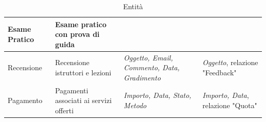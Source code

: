 \documentclass[10pt,twoside]{article}
\begin{document}
{\begin{table}[H]
\begin{tabularx}{\textwidth}{|>{\centering\arraybackslash}p{2.6cm}|>{\centering\arraybackslash}X|>{\centering\arraybackslash}p{4.85cm}|>{\centering\arraybackslash}X|}
            \rowcolor{white!40}
            Esame Pratico & Esame pratico con prova di guida & & \\
            \hline
            \rowcolor{white!40}
            Recensione & Recensione istruttori e lezioni & \textit{Oggetto, Email, Commento, Data, Gradimento} & \textit{Oggetto}, relazione "Feedback"\\
            \hline
            \rowcolor{white!40}
            Pagamento & Pagamenti associati ai servizi offerti & \textit{Importo, Data, Stato, Metodo} & \textit{Importo, Data}, relazione "Quota"\\
            \hline
        \end{tabularx}
        \caption{Entità}
        \label{fig:tabellaEntita}
    \end{table}

    \newpage

}
\end{document}
